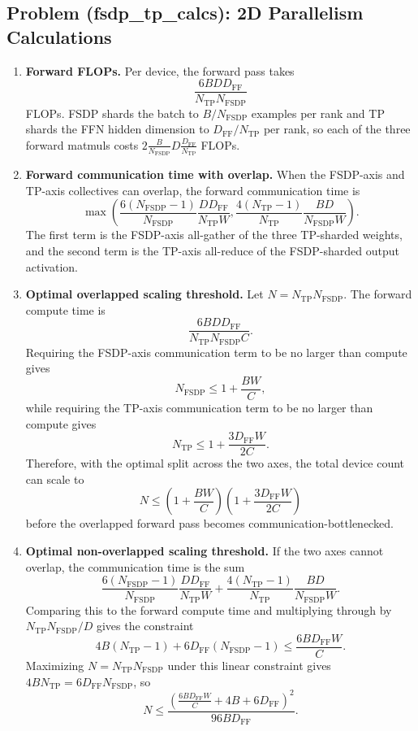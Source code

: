 \documentclass[11pt]{article}
\begin{document}
\subsection{Problem (fsdp\_tp\_calcs): 2D Parallelism Calculations}

\begin{enumerate}
  \item \textbf{Forward FLOPs.}
  Per device, the forward pass takes
  \[
    \frac{6BD D_{\mathrm{FF}}}{N_{\mathrm{TP}}N_{\mathrm{FSDP}}}
  \]
  FLOPs. FSDP shards the batch to $B/N_{\mathrm{FSDP}}$ examples per rank and TP shards the FFN hidden dimension to $D_{\mathrm{FF}}/N_{\mathrm{TP}}$ per rank, so each of the three forward matmuls costs $2\frac{B}{N_{\mathrm{FSDP}}}D\frac{D_{\mathrm{FF}}}{N_{\mathrm{TP}}}$ FLOPs.

  \item \textbf{Forward communication time with overlap.}
  When the FSDP-axis and TP-axis collectives can overlap, the forward communication time is
  \[
    \max\left(
      \frac{6(N_{\mathrm{FSDP}}-1)}{N_{\mathrm{FSDP}}}\frac{D D_{\mathrm{FF}}}{N_{\mathrm{TP}}W},
      \frac{4(N_{\mathrm{TP}}-1)}{N_{\mathrm{TP}}}\frac{BD}{N_{\mathrm{FSDP}}W}
    \right).
  \]
  The first term is the FSDP-axis all-gather of the three TP-sharded weights, and the second term is the TP-axis all-reduce of the FSDP-sharded output activation.

  \item \textbf{Optimal overlapped scaling threshold.}
  Let $N=N_{\mathrm{TP}}N_{\mathrm{FSDP}}$. The forward compute time is
  \[
    \frac{6BD D_{\mathrm{FF}}}{N_{\mathrm{TP}}N_{\mathrm{FSDP}}C}.
  \]
  Requiring the FSDP-axis communication term to be no larger than compute gives
  \[
    N_{\mathrm{FSDP}} \le 1 + \frac{BW}{C},
  \]
  while requiring the TP-axis communication term to be no larger than compute gives
  \[
    N_{\mathrm{TP}} \le 1 + \frac{3D_{\mathrm{FF}}W}{2C}.
  \]
  Therefore, with the optimal split across the two axes, the total device count can scale to
  \[
    N \le \left(1 + \frac{BW}{C}\right)\left(1 + \frac{3D_{\mathrm{FF}}W}{2C}\right)
  \]
  before the overlapped forward pass becomes communication-bottlenecked.

  \item \textbf{Optimal non-overlapped scaling threshold.}
  If the two axes cannot overlap, the communication time is the sum
  \[
    \frac{6(N_{\mathrm{FSDP}}-1)}{N_{\mathrm{FSDP}}}\frac{D D_{\mathrm{FF}}}{N_{\mathrm{TP}}W}
    +
    \frac{4(N_{\mathrm{TP}}-1)}{N_{\mathrm{TP}}}\frac{BD}{N_{\mathrm{FSDP}}W}.
  \]
  Comparing this to the forward compute time and multiplying through by $N_{\mathrm{TP}}N_{\mathrm{FSDP}}/D$ gives the constraint
  \[
    4B(N_{\mathrm{TP}}-1) + 6D_{\mathrm{FF}}(N_{\mathrm{FSDP}}-1)
    \le
    \frac{6BD_{\mathrm{FF}}W}{C}.
  \]
  Maximizing $N=N_{\mathrm{TP}}N_{\mathrm{FSDP}}$ under this linear constraint gives $4BN_{\mathrm{TP}}=6D_{\mathrm{FF}}N_{\mathrm{FSDP}}$, so
  \[
    N \le
    \frac{\left(\frac{6BD_{\mathrm{FF}}W}{C}+4B+6D_{\mathrm{FF}}\right)^2}{96BD_{\mathrm{FF}}}.
  \]
\end{enumerate}
\end{document}
